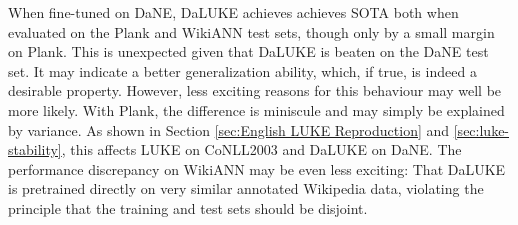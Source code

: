\documentclass[main.tex]{subfiles}
\begin{document}
When fine-tuned on DaNE, DaLUKE achieves achieves SOTA both when evaluated on the Plank and WikiANN test sets, though only by a small margin on Plank.
This is unexpected given that DaLUKE is beaten on the DaNE test set.
It may indicate a better generalization ability, which, if true, is indeed a desirable property.
However, less exciting reasons for this behaviour may well be more likely.
With Plank, the difference is miniscule and may simply be explained by variance.
As shown in Section \ref{sec:English LUKE Reproduction} and \ref{sec:luke-stability}, this affects LUKE on CoNLL2003 and DaLUKE on DaNE.
The performance discrepancy on WikiANN may be even less exciting:
That DaLUKE is pretrained directly on very similar annotated Wikipedia data, violating the principle that the training and test sets should be disjoint.
\end{document}
